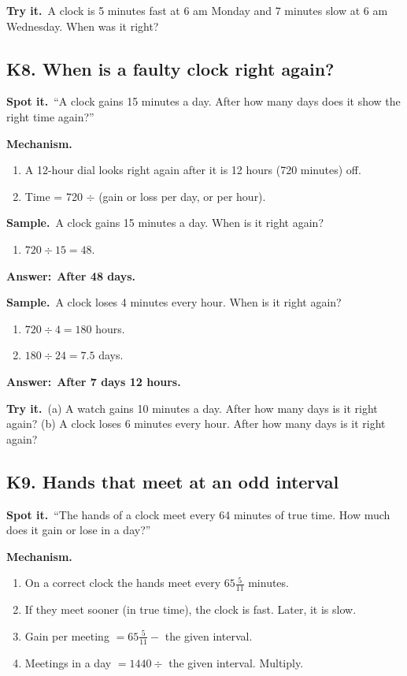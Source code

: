 \documentclass[11pt,a4paper]{article}
\let\oldsubsection\subsection
\renewcommand{\subsection}{\needspace{9\baselineskip}\oldsubsection}
\newcommand{\spot}{\textbf{\color{ember}Spot it.}\ }
\newcommand{\mech}{\textbf{\color{ember}Mechanism.}\ }
\newif\ifkeepsamp
\newcommand{\ans}[1]{\par\nopagebreak\noindent\textbf{\color{ember}Answer:}\ \textbf{#1}\par}
\newcommand{\samp}{\ifkeepsamp\needspace{4\baselineskip}\fi\textbf{\color{ember}Sample.}\ }
\newcommand{\tryit}[1]{\textbf{\color{ember}Try it.}\ #1}
\begin{document}
\tryit A clock is 5 minutes fast at 6 am Monday and 7 minutes slow at 6 am Wednesday. When was it right?

\subsection{K8. When is a faulty clock right again?}
\spot ``A clock gains 15 minutes a day. After how many days does it show the right time again?''

\mech
\begin{enumerate}
\item A 12-hour dial looks right again after it is 12 hours (720 minutes) off.
\item Time = 720 $\div$ (gain or loss per day, or per hour).
\end{enumerate}

\samp A clock gains 15 minutes a day. When is it right again?
\begin{enumerate}
\item $720 \div 15 = 48$.
\end{enumerate}
\ans{After 48 days.}

\samp A clock loses 4 minutes every hour. When is it right again?
\begin{enumerate}
\item $720 \div 4 = 180$ hours.
\item $180 \div 24 = 7.5$ days.
\end{enumerate}
\ans{After 7 days 12 hours.}

\tryit (a) A watch gains 10 minutes a day. After how many days is it right again? (b) A clock loses 6 minutes every hour. After how many days is it right again?

\subsection{K9. Hands that meet at an odd interval}
\spot ``The hands of a clock meet every 64 minutes of true time. How much does it gain or lose in a day?''

\mech
\begin{enumerate}
\item On a correct clock the hands meet every $65\tfrac5{11}$ minutes.
\item If they meet sooner (in true time), the clock is fast. Later, it is slow.
\item Gain per meeting $= 65\tfrac5{11} - $ the given interval.
\item Meetings in a day $= 1440 \div$ the given interval. Multiply.
\end{enumerate}
\end{document}
